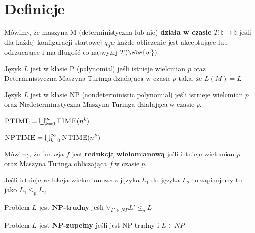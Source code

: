 \section{Definicje}

\begin{definition}
	Mówimy, że maszyna M (deterministyczna lub nie) \textbf{działa w czasie} \( T : \natural \rightarrow \natural \) jeśli dla każdej konfiguracji startowej \( q_0 w \) każde obliczenie jest akceptujące lub odrzucające i ma długość co najwyżej \( T(\abs{w}) \)
\end{definition}

\begin{definition}
	Język \( L \) jest w klasie P (polynomial) jeśli istnieje wielomian \( p \)
	oraz Deterministyczna Maszyna Turinga działająca w czasie \( p \) taka, że \( L(M) = L \)
\end{definition}

\begin{definition}
	Język \( L \) jest w klasie NP (nondeterministic polynomial) jeśli istnieje wielomian \( p \) oraz Niedeterministyczna Maszyna Turinga działająca w czasie \( p \).
\end{definition}

\begin{definition}
	\( \textsc{PTIME} = \bigcup_{k=0}^\infty \textsc{TIME}(n^k) \)
\end{definition}

\begin{definition}
	\( \textsc{NPTIME} = \bigcup_{k=0}^\infty \textsc{NTIME}(n^k) \)
\end{definition}


\begin{definition}
	Mówimy, że funkcja \( f \) jest \textbf{redukcją wielomianową} jeśli istnieje wielomian \( p \) oraz Maszyna Turinga obliczająca \( f \) w czasie \( p \).

	Jeśli istnieje redukcja wielomianowa z języka \( L_1 \) do języka \( L_2 \) to zapisujemy to jako \( L_1 \leq_p L_2 \)
\end{definition}

\begin{definition}
	Problem \( L \) jest \textbf{NP-trudny} jeśli \( \forall_{L' \in NP} L' \leq_p L \)
\end{definition}
\begin{definition}
	Problem \( L \) jest \textbf{NP-zupełny} jeśli jest NP-trudny i \( L \in NP \)
\end{definition}

